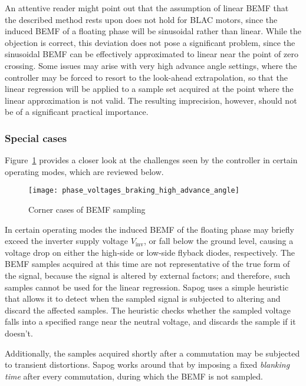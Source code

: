 \documentclass{zubaxdoc}
\begin{document}
An attentive reader might point out that the assumption of linear BEMF that the described method rests
upon does not hold for BLAC motors, since the induced BEMF of a floating phase will be sinusoidal rather
than linear.
While the objection is correct, this deviation does not pose a significant problem, since the sinusoidal
BEMF can be effectively approximated to linear near the point of zero crossing.
Some issues may arise with very high advance angle settings, where the controller may be forced to resort to
the look-ahead extrapolation, so that the linear regression will be applied to a sample set acquired
at the point where the linear approximation is not valid.
The resulting imprecision, however, should not be of a significant practical importance.

\subsubsection{Special cases}

Figure~\ref{phase_voltage_sampling_corner_cases} provides a closer look at the challenges
seen by the controller in certain operating modes, which are reviewed below.

\begin{figure}[hbtp]
	\centering
	\texttt{[image: phase\_voltages\_braking\_high\_advance\_angle]}
	\caption{Corner cases of BEMF sampling
		\label{phase_voltage_sampling_corner_cases}}
\end{figure}

In certain operating modes the induced BEMF of the floating phase may briefly exceed the
inverter supply voltage $V_\text{inv}$, or fall below the ground level,
causing a voltage drop on either the high-side or low-side flyback diodes, respectively.
The BEMF samples acquired at this time are not representative of the true form of the signal,
because the signal is altered by external factors;
and therefore, such samples cannot be used for the linear regression.
Sapog uses a simple heuristic that allows it to detect when the sampled signal is subjected to
altering and discard the affected samples.
The heuristic checks whether the sampled voltage falls into a specified range near the neutral voltage,
and discards the sample if it doesn't.

Additionally, the samples acquired shortly after a commutation may be subjected to transient distortions.
Sapog works around that by imposing a fixed \emph{blanking time} after every commutation, during which
the BEMF is not sampled.
\end{document}
